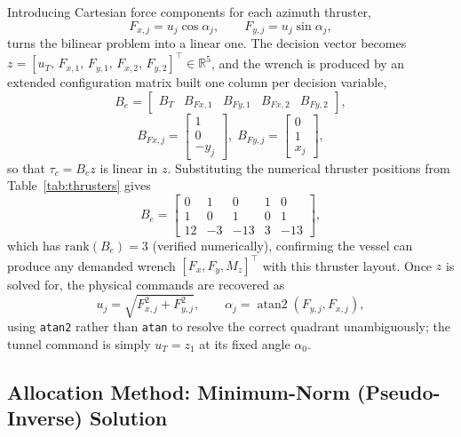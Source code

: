 \documentclass[10pt,conference]{IEEEtran}
\begin{document}
Introducing Cartesian force components for each azimuth thruster,
\begin{equation}
F_{x,j} = u_j\cos\alpha_j, \qquad F_{y,j} = u_j\sin\alpha_j,
\end{equation}
turns the bilinear problem into a linear one. The decision vector
becomes $z=[u_T,\,F_{x,1},\,F_{y,1},\,F_{x,2},\,F_{y,2}]^\top \in
\mathbb{R}^5$, and the wrench is produced by an extended configuration
matrix built one column per decision variable,
\begin{equation}
B_e = \begin{bmatrix} B_T & B_{Fx,1} & B_{Fy,1} & B_{Fx,2} & B_{Fy,2}
\end{bmatrix},
\end{equation}
\begin{equation}
B_{Fx,j}=\begin{bmatrix}1\\0\\-y_j\end{bmatrix}\!, \;
B_{Fy,j}=\begin{bmatrix}0\\1\\x_j\end{bmatrix}\!,
\end{equation}
so that $\tau_c = B_e z$ is linear in $z$. Substituting the numerical
thruster positions from Table~\ref{tab:thrusters} gives
\begin{equation}
B_e = \begin{bmatrix}
0 & 1 & 0 & 1 & 0 \\
1 & 0 & 1 & 0 & 1 \\
12 & -3 & -13 & 3 & -13
\end{bmatrix},
\label{eq:Be}
\end{equation}
which has $\mathrm{rank}(B_e)=3$ (verified numerically), confirming
the vessel can produce any demanded wrench $[F_x,F_y,M_z]^\top$ with
this thruster layout. Once $z$ is solved for, the physical commands
are recovered as
\begin{equation}
u_j = \sqrt{F_{x,j}^2+F_{y,j}^2}, \qquad
\alpha_j = \operatorname{atan2}(F_{y,j}, F_{x,j}),
\label{eq:recover}
\end{equation}
using \texttt{atan2} rather than \texttt{atan} to resolve the
correct quadrant unambiguously; the tunnel command is simply
$u_T=z_1$ at its fixed angle $\alpha_0$.

\subsection{Allocation Method: Minimum-Norm (Pseudo-Inverse) Solution}
\end{document}
